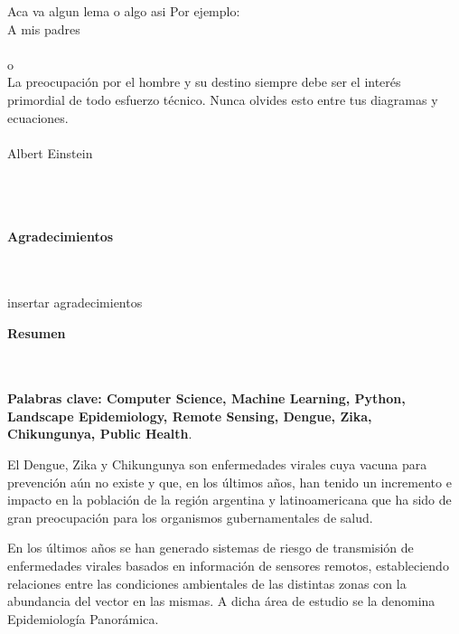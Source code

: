 \begin{flushright}
\begin{minipage}{8cm}
    \noindent
        \small
        Aca va algun lema o algo asi
        Por ejemplo:\\[1.0cm]
        A mis padres\\[1.0cm]\\
        o\\[1.0cm]
        La preocupaci\'{o}n por el hombre y su destino siempre debe ser el
        inter\'{e}s primordial de todo esfuerzo t\'{e}cnico. Nunca olvides esto
        entre tus diagramas y ecuaciones.\\\\
        Albert Einstein\\
\end{minipage}
\end{flushright}

\newpage{\pagestyle{empty}\cleardoublepage}

\newpage
\thispagestyle{empty} \textbf{}\normalsize
\\\\\\%
\textbf{\LARGE Agradecimientos}
\\\\
insertar agradecimientos

\newpage{\pagestyle{empty}\cleardoublepage}

\newpage
\textbf{\LARGE Resumen}
\\\\

\textbf{\small Palabras clave: Computer Science, Machine Learning, Python,
      Landscape Epidemiology, Remote Sensing, Dengue, Zika, Chikungunya, Public Health}.\\
\justifying
  \par El Dengue, Zika y Chikungunya son enfermedades virales cuya vacuna para
    prevención aún no existe y que, en los últimos años, han tenido un incremento
    e impacto en la población de la región argentina y latinoamericana que ha
    sido de gran preocupación para los organismos gubernamentales de salud.

  \par En los últimos años se han generado sistemas de riesgo de transmisión
    de enfermedades virales basados en información de sensores remotos,
    estableciendo relaciones entre las condiciones ambientales de las distintas
    zonas con la abundancia del vector en las mismas. A dicha área de estudio
    se la denomina Epidemiología Panorámica.


